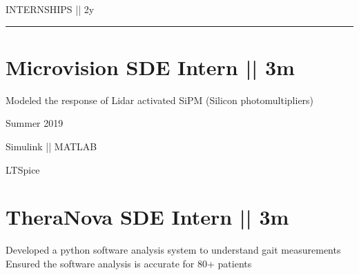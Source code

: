 \vspace{-1.4ex}
{
\hspace{-1.72in}\noindent\color{cblue}
{INTERNSHIPS  } 
{\small \color{black} || 2y}
}

\vspace{-1.6ex}

{\hspace{-1.73in}\noindent\color{dblue}\rule{6.935in}{0.4pt}}  

\vspace{-0.4ex}

\section
{\textbf{Microvision}
\newline
SDE Intern || 3m
\newline}


\vspace{-2.5ex}
\begin{detail}
\BulletItem
Modeled the response of Lidar activated SiPM (Silicon photomultipliers) 
\end{detail}

\begin{subtitle}
\vspace{-5ex}
{{Summer 2019}} 
\end{subtitle}

\vspace{-1.5ex}
{
\vspace{-0.8ex}
\color{cyan}\small
{Simulink || MATLAB} 
}

{
\vspace{-2.5ex}\hspace{1.5in}
\color{cyan}\small
{LTSpice} 
}

\vspace{0.8ex}
\section
{\textbf{TheraNova}
\newline
SDE Intern || 3m
}

\BulletItem
\vspace{-2.5ex}
\begin{detail}

\BulletItem
 Developed a python software analysis system to understand gait measurements
\BulletItem
 Ensured the software analysis is accurate for 80+ patients
\end{detail}

